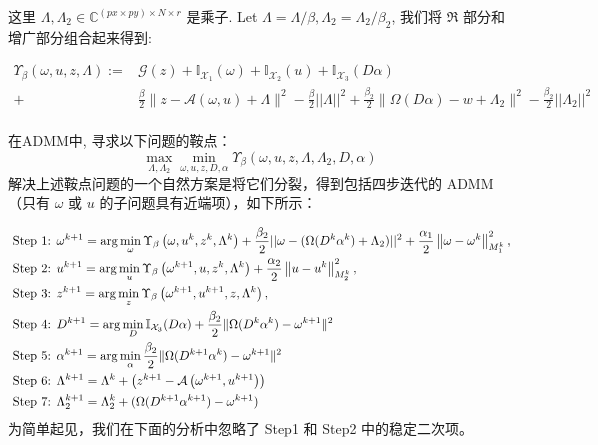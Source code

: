 \documentclass[12pt]{article}
\begin{document}
这里 $\Lambda,\Lambda_2 \in \mathbb{C}^{(px \times py) \times N \times r}$ 是乘子.
Let $\Lambda = \Lambda / \beta, \Lambda_2 = \Lambda_2 / \beta_2$, 我们将 $\Re$ 部分和增广部分组合起来得到:

\begin{equation}
\begin{aligned}
\Upsilon_{\beta}(\omega, u, z, \Lambda):=&\mathcal{G}(z)+\mathbb{I}_{\mathcal{X}_{1}}(\omega)+\mathbb{I}_{\mathcal{X}_{2}}(u)+ \mathbb{I}_{\mathcal{X}_{3}}(D\alpha)  \\
+&\frac{\beta}{2}\|z-\mathcal{A}(\omega, u) + \Lambda \|^{2} - \frac{\beta}{2}||\Lambda||^2 +\frac{\beta_2}{2}\| \Omega(D\alpha) - w + \Lambda_2\|^{2} - \frac{\beta_2}{2}||\Lambda_2||^2 \\
\end{aligned}
\end{equation} 

在ADMM中, 寻求以下问题的鞍点：
$$
\max _{\Lambda,\Lambda_2} \min _{\omega, u, z,D,\alpha} \Upsilon_{\beta}(\omega, u, z, \Lambda,\Lambda_2,D,\alpha)
$$
解决上述鞍点问题的一个自然方案是将它们分裂，得到包括四步迭代的 ADMM（只有 $\omega$ 或 $u$ 的子问题具有近端项），如下所示：

\begin{align}
\text { Step 1: } & \omega^{k+1}=\arg \min _{\omega} \Upsilon_{\beta}\left(\omega, u^{k}, z^{k}, \Lambda^{k}\right)+
\frac{\beta_{2}}{2}||\omega - (\Omega(D^k\alpha^k) + \Lambda_2)||^2 + 
\frac{\alpha_{1}}{2}\left\|\omega-\omega^{k}\right\|_{M_{1}^{k}}^{2}, \notag \\
\text { Step 2: } & u^{k+1}=\arg \min _{u} \Upsilon_{\beta}\left(\omega^{k+1}, u, z^{k}, \Lambda^{k}\right)+\frac{\alpha_{2}}{2}\left\|u-u^{k}\right\|_{M_{2}^{k}}^{2}, \notag \\ \text { Step 3: } & z^{k+1}=\arg \min _{z} \Upsilon_{\beta}\left(\omega^{k+1}, u^{k+1}, z, \Lambda^{k}\right), \notag \\
\text { Step 4: } & D^{k+1}=\arg \min _{D} \mathbb{I}_{\mathcal{X}_{3}}(D\alpha) +
\frac{\beta_2}{2}\| \Omega(D^k\alpha^k) - \omega^{k+1}\|^{2} \notag \\
\text { Step 5: } & \alpha^{k+1}=\arg \min _{\alpha}  \frac{\beta_2}{2}\| \Omega(D^{k+1}\alpha^k) - \omega^{k+1}\|^{2}\notag \\
\text { Step 6: } &
\Lambda^{k+1}=\Lambda^{k}+\left(z^{k+1}-\mathcal{A}\left(\omega^{k+1}, u^{k+1}\right)\right)  \label{Lup}\\
\text { Step 7: } & \Lambda_2^{k+1}=\Lambda_2^{k}+ (\Omega(D^{k+1}\alpha^{k+1}) - \omega^{k+1}) \label{L2up}
\end{align}
为简单起见，我们在下面的分析中忽略了 Step1 和 Step2 中的稳定二次项。
\end{document}
